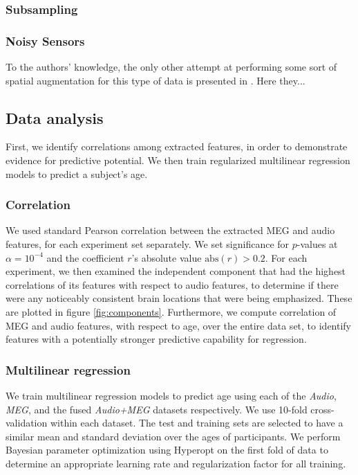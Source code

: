\documentclass[utf8]{frontiersSCNS} %
\begin{document}
\subsubsection{Subsampling}

\subsubsection{Noisy Sensors}

To the authors' knowledge, the only other attempt at performing some sort of spatial augmentation for this type of data is presented in \cite{}. Here they...


\subsection{Data analysis}

First, we identify correlations among extracted features, in order to demonstrate evidence for predictive potential. We then train regularized multilinear regression models to predict a subject's age.

\subsubsection{Correlation}

We used standard Pearson correlation between the extracted MEG and audio features, for each experiment set separately. We set significance for $p$-values at $\alpha = 10^{-4}$ and the coefficient $r$'s absolute value $\text{abs}(r) > 0.2$. For each experiment, we then examined the independent component that had the highest correlations of its features with respect to audio features, to determine if there were any noticeably consistent brain locations that were being emphasized. These are plotted in figure \ref{fig:components}. Furthermore, we compute correlation of MEG and audio features, with respect to age, over the entire data set, to identify features with a potentially stronger predictive capability for regression.

\subsubsection{Multilinear regression}

We train multilinear regression models to predict age using each of the \textit{Audio}, \textit{MEG}, and the fused \textit{Audio+MEG} datasets respectively. We use 10-fold cross-validation within each dataset. The test and training sets are selected to have a similar mean and standard deviation over the ages of participants. We perform Bayesian parameter optimization using Hyperopt \cite{Bergstra2013} on the first fold of data to determine an appropriate learning rate and regularization factor for all training.
\end{document}

